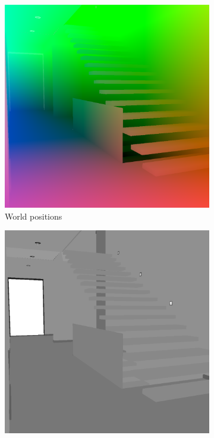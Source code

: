 \begin{figure}
\begin{subfigure}[t]{0.24\linewidth}
		\includegraphics[width=\textwidth]{chapters/chapter_thetool/worldpos_scenepass2}
		\caption{World positions}
		\label{worldpos_scenepass2}
	\end{subfigure}
	\begin{subfigure}[t]{0.24\linewidth}
		\includegraphics[width=\textwidth]{chapters/chapter_thetool/worldposa_scenepass2}

\end{subfigure}
\end{figure}
